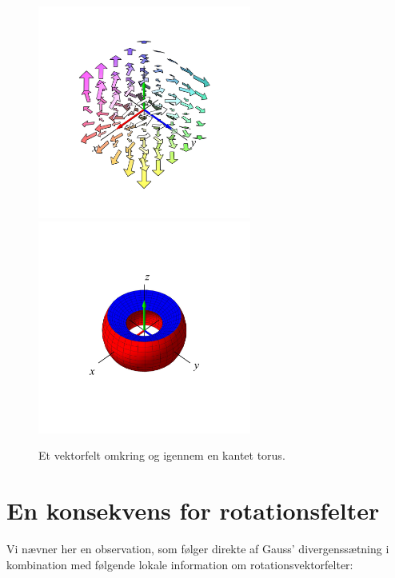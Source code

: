 \begin{figure}[ht]
\centerline{\includegraphics[width=70mm]{FIGS/plotTorusGauss1}\includegraphics[width=70mm]{FIGS/plotTorusGauss2}}
\begin{center}
\caption{\small{Et vektorfelt omkring og igennem en kantet torus.}} \label{figTorusGauss}
\end{center}
\end{figure}


\section{En konsekvens for rotationsfelter} \label{secKonsekvens}
Vi nævner her en observation, som følger direkte af Gauss' divergenssætning i kombination med følgende  lokale information om rotationsvektorfelter:

